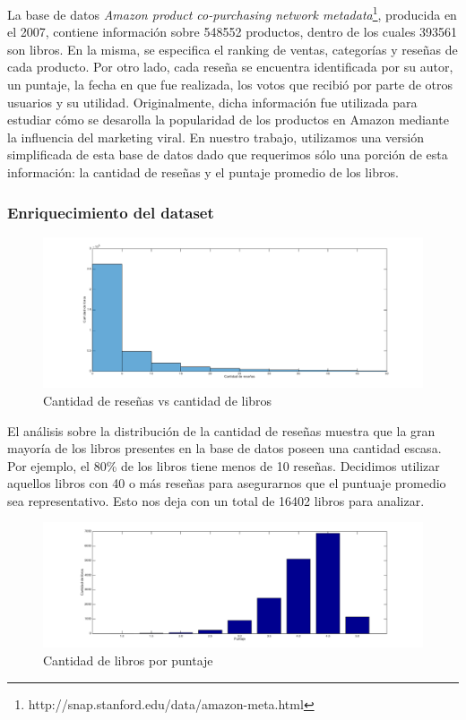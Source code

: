 \documentclass[12pt,journal,compsoc]{IEEEtran}
\begin{document}
La base de datos \textit{Amazon product co-purchasing network metadata}\footnote{http://snap.stanford.edu/data/amazon-meta.html}, producida en el 2007, contiene información sobre 548552 productos, dentro de los cuales 393561 son libros. En la misma, se especifica el ranking de ventas, categorías y reseñas de cada producto. Por otro lado, cada reseña se encuentra identificada por su autor, un puntaje, la fecha en que fue realizada, los votos que recibió por parte de otros usuarios y su utilidad. Originalmente, dicha información fue utilizada para estudiar cómo se desarolla la popularidad de los productos en Amazon mediante la influencia del marketing viral\cite{leskovec}. En nuestro trabajo, utilizamos una versión simplificada de esta base de datos dado que requerimos sólo una porción de esta información: la cantidad de reseñas y el puntaje promedio de los libros.

\subsubsection{Enriquecimiento del dataset}

\begin{figure}[H]
  \includegraphics[width=7.0in]{imgs/cantResenasVsCantLibros.png}
  \caption{Cantidad de reseñas vs cantidad de libros}
\end{figure} 

El análisis sobre la distribución de la cantidad de reseñas muestra que la gran mayoría de los libros presentes en la base de datos poseen una cantidad escasa. Por ejemplo, el 80\% de los libros tiene menos de 10 reseñas. Decidimos utilizar aquellos libros con 40 o más reseñas para asegurarnos que el puntuaje promedio sea representativo. Esto nos deja con un total de 16402 libros para analizar.

\begin{figure}[H]
  \includegraphics[width=7.0in]{imgs/cantidadDeLibrosVsPuntaje.png}
  \caption{Cantidad de libros por puntaje}
\end{figure} 
\end{document}
